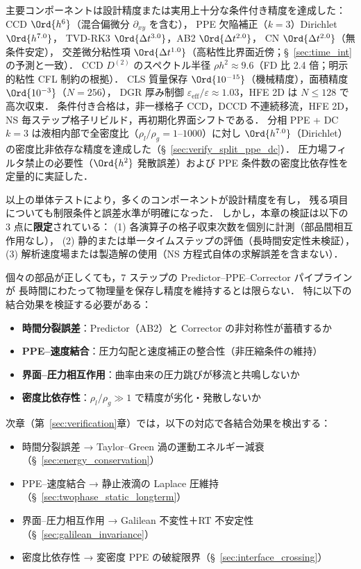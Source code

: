 \begin{tcolorbox}[resultbox, title={コンポーネント検証の総括}]
主要コンポーネントは設計精度または実用上十分な条件付き精度を達成した：
CCD $\Ord{h^6}$（混合偏微分 $\partial_{xy}$ を含む），
PPE 欠陥補正（$k{=}3$）Dirichlet $\Ord{h^{7.0}}$，
TVD-RK3 $\Ord{\Delta t^{3.0}}$，AB2 $\Ord{\Delta t^{2.0}}$，
CN $\Ord{\Delta t^{2.0}}$（無条件安定），
交差微分粘性項 $\Ord{\Delta t^{1.0}}$（高粘性比界面近傍；§~\ref{sec:time_int} の予測と一致）．
CCD $D^{(2)}$ のスペクトル半径 $\rho h^2 \approx 9.6$（FD 比 2.4 倍；明示的粘性 CFL 制約の根拠）．
CLS 質量保存 $\Ord{10^{-15}}$（機械精度），面積精度 $\Ord{10^{-3}}$（$N{=}256$），
DGR 厚み制御 $\varepsilon_{\mathrm{eff}}/\varepsilon \approx 1.03$，HFE 2D は $N\le128$ で高次収束．
条件付き合格は，非一様格子 CCD，DCCD 不連続移流，HFE 2D，
NS 毎ステップ格子リビルド，再初期化界面シフトである．
分相 PPE + DC $k{=}3$ は液相内部で全密度比（$\rho_l/\rho_g = 1$--$1000$）に対し
$\Ord{h^{7.0}}$（Dirichlet）の密度比非依存な精度を達成した（§~\ref{sec:verify_split_ppe_dc}）．
圧力場フィルタ禁止の必要性（$\Ord{h^2}$ 発散誤差）および
PPE 条件数の密度比依存性を定量的に実証した．
\end{tcolorbox}

以上の単体テストにより，多くのコンポーネントが設計精度を有し，
残る項目についても制限条件と誤差水準が明確になった．
しかし，本章の検証は以下の 3 点に\textbf{限定}されている：
(1) 各演算子の格子収束次数を個別に計測（部品間相互作用なし），
(2) 静的または単一タイムステップの評価（長時間安定性未検証），
(3) 解析速度場または製造解の使用（NS 方程式自体の求解誤差を含まない）．

個々の部品が正しくても，7 ステップの Predictor--PPE--Corrector パイプラインが
長時間にわたって物理量を保存し精度を維持するとは限らない．
特に以下の結合効果を検証する必要がある：
\begin{itemize}[noitemsep]
  \item \textbf{時間分裂誤差}：Predictor（AB2）と Corrector の非対称性が蓄積するか
  \item \textbf{PPE--速度結合}：圧力勾配と速度補正の整合性（非圧縮条件の維持）
  \item \textbf{界面--圧力相互作用}：曲率由来の圧力跳びが移流と共鳴しないか
  \item \textbf{密度比依存性}：$\rho_l/\rho_g \gg 1$ で精度が劣化・発散しないか
\end{itemize}
次章（第~\ref{sec:verification}章）では，以下の対応で各結合効果を検出する：
\begin{itemize}[noitemsep]
  \item 時間分裂誤差 → Taylor--Green 渦の運動エネルギー減衰（§~\ref{sec:energy_conservation}）
  \item PPE--速度結合 → 静止液滴の Laplace 圧維持（§~\ref{sec:twophase_static_longterm}）
  \item 界面--圧力相互作用 → Galilean 不変性＋RT 不安定性（§~\ref{sec:galilean_invariance}）
  \item 密度比依存性 → 変密度 PPE の破綻限界（§~\ref{sec:interface_crossing}）
\end{itemize}
